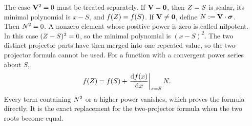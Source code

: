 The case \(\mathbf{V}^2=0\) must be treated separately. If
\(\mathbf{V}=\mathbf{0}\), then \(Z=S\) is scalar, its minimal polynomial
is \(x-S\), and \(f(Z)=f(S)\). If
\(\mathbf{V}\neq\mathbf{0}\), define
\(N:=\mathbf{V}\cdot\mathbf{\bm{\sigma}}\). Then \(N^2=0\). A nonzero element whose
positive power is zero is called nilpotent. In this case
\((Z-S)^2=0\), so the minimal polynomial is \((x-S)^2\).
The two distinct projector parts have then merged into one repeated value,
so the two-projector formula cannot be used. For a function with a
convergent power series about \(S\),
\begin{equation*}
f(Z)
=f(S)+\left.\frac{\mathrm d f(x)}{\mathrm d x}\right|_{x=S}N.
\end{equation*}
Every term containing \(N^2\) or a higher power vanishes, which proves
the formula directly. It is the exact replacement for the two-projector
formula when the two roots become equal.
